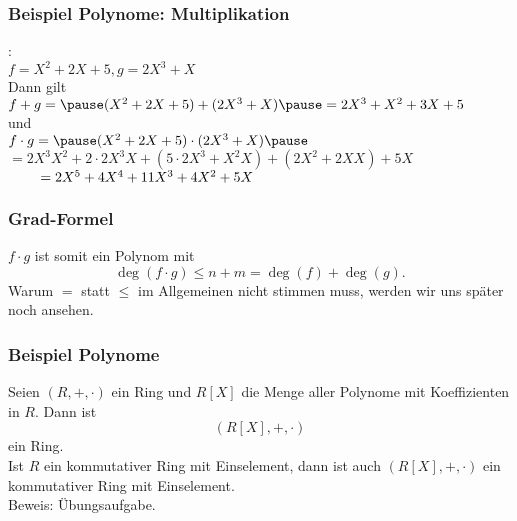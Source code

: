 %
%
\begin{frame}\frametitle{Beispiel Polynome: Multiplikation}
	
:\\
	$
		f = X^2 + 2X + 5, g = 2X^3 + X 
	$\\\pause \vfill
Dann gilt\\
\vspace{2mm}
$
f+g=\pause (X^2 + 2X + 5) + (2X^3 + X)\pause = 2X^3+X^2+3X+5
$\\
\vspace{2mm}
und\\
\vspace{2mm}
$
f\cdot g=\pause (X^2 + 2X + 5) \cdot (2X^3 + X) \pause $\\
\hspace{8mm}$=2 X^3X^2 + 2\cdot2 X^3X+(5\cdot2X^3 + X^2X) + (2X^2+2XX)+5X$\\\pause
$\hspace{8mm}=2X^5+4X^4+11X^3+4X^2+5X
$
\end{frame}
%
%
\begin{frame}\frametitle{Grad-Formel}
	$f\cdot g$ ist somit ein Polynom mit 
	$$
		\deg(f\cdot g) \le n + m = \deg(f) + \deg(g).
	$$
	\vfill \pause
	Warum $=$ statt $\le$ im Allgemeinen nicht stimmen muss, werden wir uns später noch ansehen.
\end{frame}
%
%
\begin{frame}\frametitle{Beispiel Polynome}
	
	Seien $(R,+,\cdot)$ ein Ring und $R[X]$ die Menge aller Polynome mit Koeffizienten in $R$. Dann ist
	$$
		(R[X],+,\cdot)
	$$
	ein Ring.\\[2mm]
	\pause
	Ist $R$ ein kommutativer Ring mit Einselement, dann ist auch $(R[X],+,\cdot)$ ein kommutativer Ring mit Einselement.\\[2mm]

	Beweis: \"Ubungsaufgabe.
\end{frame}
%
%	
